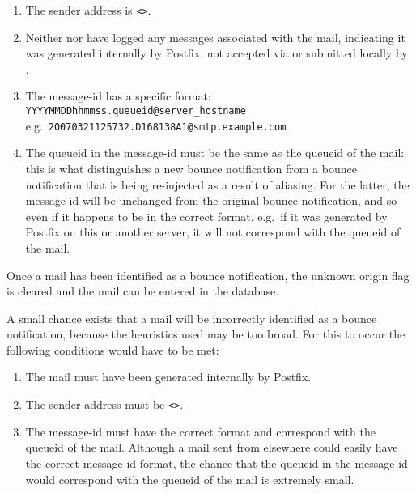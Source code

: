 \begin{enumerate}

    \item The sender address is \verb!<>!.\glsadd{<>}

    \item Neither  nor  have logged any
        messages associated with the mail, indicating it was generated
        internally by Postfix, not accepted via  or submitted
        locally by .

    \item The message-id has a specific format: \newline{}
        \tab{} \texttt{YYYYMMDDhhmmss.queueid@server\_hostname} \newline{}
        e.g.\ \texttt{20070321125732.D168138A1@smtp.example.com}

    \item The queueid in the message-id must be the same as the queueid of
        the mail: this is what distinguishes a new bounce notification from
        a bounce notification that is being re-injected as a result of
        aliasing.  For the latter, the message-id will be unchanged from
        the original bounce notification, and so even if it happens to be
        in the correct format, e.g.\ if it was generated by Postfix on this
        or another server, it will not correspond with the queueid of the
        mail.

\end{enumerate}

Once a mail has been identified as a bounce notification, the unknown
origin flag is cleared and the mail can be entered in the database.

A small chance exists that a mail will be incorrectly identified as a
bounce notification, because the heuristics used may be too broad.  For this to
occur the following conditions would have to be met:

\begin{enumerate}

    \item The mail must have been generated internally by Postfix.

    \item The sender address must be \verb!<>!.\glsadd{<>}

    \item The message-id must have the correct format and correspond with
        the queueid of the mail.  Although a mail sent from elsewhere could
        easily have the correct message-id format, the chance that the
        queueid in the message-id would correspond with the queueid of the
        mail is extremely small.

\end{enumerate}

